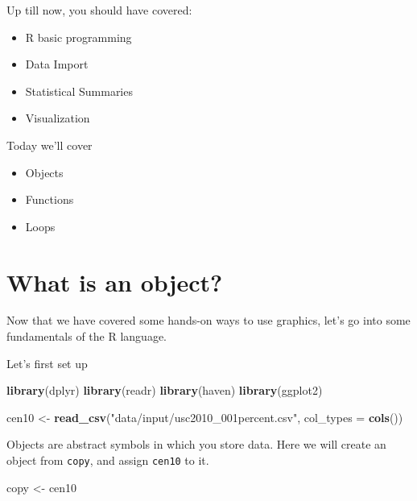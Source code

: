 \documentclass[
]{book}
\newenvironment{Shaded}{\begin{snugshade}}{\end{snugshade}}
\newcommand{\DataTypeTok}[1]{\textcolor[rgb]{0.13,0.29,0.53}{#1}}
\newcommand{\KeywordTok}[1]{\textcolor[rgb]{0.13,0.29,0.53}{\textbf{#1}}}
\newcommand{\NormalTok}[1]{#1}
\newcommand{\StringTok}[1]{\textcolor[rgb]{0.31,0.60,0.02}{#1}}
\providecommand{\tightlist}{%
  \setlength{\itemsep}{0pt}\setlength{\parskip}{0pt}}
\theoremstyle{definition}
\theoremstyle{definition}
\theoremstyle{definition}
\theoremstyle{remark}
\begin{document}
Up till now, you should have covered:

\begin{itemize}
\tightlist
\item
  R basic programming
\item
  Data Import
\item
  Statistical Summaries
\item
  Visualization
\end{itemize}

Today we'll cover

\begin{itemize}
\tightlist
\item
  Objects
\item
  Functions
\item
  Loops
\end{itemize}

\hypertarget{what-is-an-object}{%
\section{What is an object?}\label{what-is-an-object}}

Now that we have covered some hands-on ways to use graphics, let's go into some fundamentals of the R language.

Let's first set up

\begin{Shaded}
\begin{Highlighting}[]
\KeywordTok{library}\NormalTok{(dplyr)}
\KeywordTok{library}\NormalTok{(readr)}
\KeywordTok{library}\NormalTok{(haven)}
\KeywordTok{library}\NormalTok{(ggplot2)}
\end{Highlighting}
\end{Shaded}

\begin{Shaded}
\begin{Highlighting}[]
\NormalTok{cen10 <{-}}\StringTok{ }\KeywordTok{read\_csv}\NormalTok{(}\StringTok{"data/input/usc2010\_001percent.csv"}\NormalTok{, }\DataTypeTok{col\_types =} \KeywordTok{cols}\NormalTok{())}
\end{Highlighting}
\end{Shaded}

Objects are abstract symbols in which you store data. Here we will create an object from \texttt{copy}, and assign \texttt{cen10} to it.

\begin{Shaded}
\begin{Highlighting}[]
\NormalTok{copy <{-}}\StringTok{ }\NormalTok{cen10 }
\end{Highlighting}
\end{Shaded}
\end{document}
